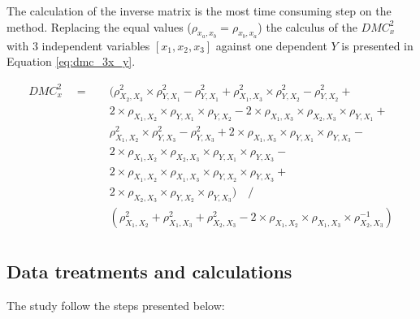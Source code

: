 \documentclass[10pt,letterpaper]{article}
\newcommand{\dmc}{\(DMC_x^2\) }
\begin{document}
The calculation of the inverse matrix is the most time consuming step on the method. Replacing the equal values  (\(\rho_{x_{a},x_{b}} = \rho_{x_{b},x_{a}}\)) the  calculus of the \dmc with 3 independent variables \([x_{1}, x_{2}, x_{3}]\) against one dependent \(Y\) is presented in Equation \ref{eq:dmc_3x_y}.

\begin{equation}\label{eq:dmc_3x_y} 
  \begin{split}
DMC_{x}^{2} \quad = \quad & ( \rho^{2}_{X_{2},X_{3}} \times \rho^{2}_{Y,X_{1}}- \rho^{2}_{Y,X_{1}} + \rho^{2}_{X_{1},X_{3}}\times \rho^{2}_{Y,X_{2}}-\rho^{2}_{Y,X_{2}}+ \\
& 2 \times \rho_{X_{1},X_{2}} \times \rho_{Y,X_{1}} \times \rho_{Y,X_{2}}   - 2 \times \rho_{X_{1},X_{3}} \times \rho_{X_{2},X_{3}} \times \rho_{Y,X_{1}} + \\
& \rho^{2}_{X_{1},X_{2}} \times \rho^{2}_{Y,X_{3}}-\rho^{2}_{Y,X_{3}} + 2 \times \rho_{X_{1},X_{3}} \times \rho_{Y,X_{1}} \times \rho_{Y,X_{3}} - \\ 
& 2 \times \rho_{X_{1},X_{2}} \times \rho_{X_{2},X_{3}} \times \rho_{Y,X_{1}} \times \rho_{Y,X_{3}} - \\
& 2 \times \rho_{X_{1},X_{2}} \times \rho_{X_{1},X_{3}} \times \rho_{Y,X_{2}} \times \rho_{Y,X_{3}} + \\
& 2 \times \rho_{X_{2},X_{3}} \times \rho_{Y,X_{2}} \times \rho_{Y,X_{3}} ) \quad / \\
& ( \rho^{2}_{X_{1},X_{2}} + \rho^{2}_{X_{1},X_{3}} + \rho^{2}_{X_{2},X_{3}} - 2 \times \rho_{X_{1},X_{2}} \times \rho_{X_{1},X_{3}} \times \rho_{X_{2},X_{3}}^{-1}) \\
 \end{split}
\end{equation}

\subsection*{Data treatments and calculations}

The study follow the steps presented below:
\end{document}
